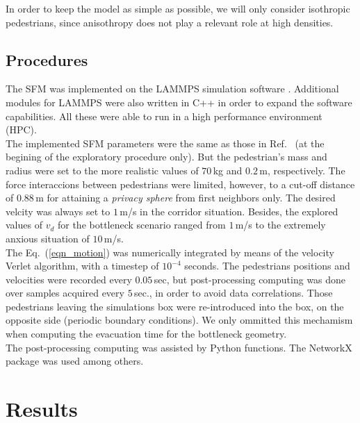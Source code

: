 \documentclass[preprint,12pt]{elsarticle}
\begin{document}
In order to keep the model as simple as possible, we will only consider 
isothropic pedestrians, since anisothropy does not play a relevant role at high 
densities. \\ 



\subsection{Procedures} 

The SFM was implemented on the LAMMPS simulation software \cite{plimpton}. 
Additional modules for LAMMPS were also written in C++ in order to expand the 
software capabilities. All these were able to run in a high performance 
environment (HPC). \\


The implemented SFM parameters were the same as those in 
Ref.~\cite{helbing_2000} (at the begining of the exploratory procedure only). 
But the pedestrian's mass and radius were set to the more realistic values of 
$70\,$kg and $0.2\,$m, respectively. The force interaccions between 
pedestrians were limited, however, to a cut-off distance of $0.88\,$m for 
attaining a \textit{privacy sphere} from first neighbors only. The desired 
velcity was always set to $1\,$m/s in the corridor situation. Besides, the 
explored values of $v_d$ for the bottleneck scenario ranged from $1\,$m/s to the 
extremely anxious situation of $10\,$m/s. \\


The Eq.~(\ref{eqn_motion}) was numerically integrated by means of the velocity 
Verlet algorithm, with a timestep of $10^{-4}$ seconds. The pedestrians 
positions and velocities were recorded every $0.05\,$sec, but post-processing 
computing was done over samples acquired every $5\,$sec., in order to avoid 
data correlations. Those pedestrians leaving the simulations box were 
re-introduced into the box, on the opposite side (periodic boundary 
conditions). We only ommitted this mechamism when computing the evacuation time 
for the bottleneck geometry. \\ 


The post-processing computing was assisted by Python functions. The NetworkX 
package was used among others.   \\



\section{\label{results}Results}
\end{document}
